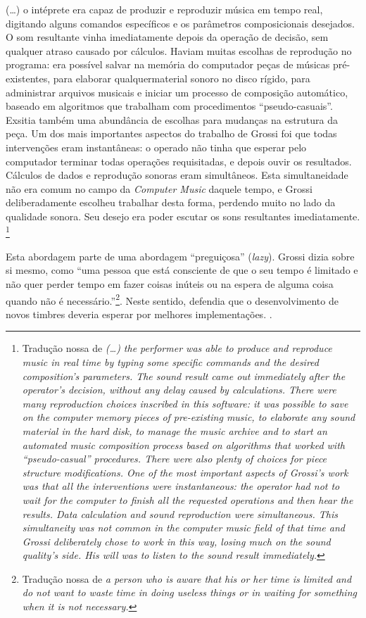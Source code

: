 \begin{citacao}
(\ldots) o intéprete era capaz de produzir e reproduzir música em tempo real, digitando alguns comandos específicos e os parâmetros composicionais desejados. O som resultante vinha imediatamente depois da operação de decisão, sem qualquer atraso causado por cálculos. Haviam muitas escolhas de reprodução no programa: era possível salvar na memória do computador peças de músicas pré-existentes, para elaborar qualquermaterial sonoro no disco rígido, para administrar arquivos musicais e iniciar um processo de composição automático, baseado em algoritmos que trabalham com procedimentos ``pseudo-casuais''. Exsitia também uma abundância de escolhas para mudanças na estrutura da peça. Um dos mais importantes aspectos do trabalho de Grossi foi que todas intervenções eram instantâneas: o operado não tinha que esperar pelo computador terminar todas operações requisitadas, e depois ouvir os resultados. Cálculos de dados e reprodução sonoras eram simultâneos. Esta simultaneidade não era comum no campo da \emph{Computer Music} daquele tempo, e Grossi deliberadamente escolheu trabalhar desta forma, perdendo muito no lado da qualidade sonora. Seu desejo era poder escutar os sons resultantes imediatamente. \cite[p.~126]{mori_pietro_2015} \footnote{Tradução nossa de \emph{(\ldots) the performer was able to produce and reproduce music in real time by typing some specific commands and the desired composition's parameters. The sound result came out immediately after the operator's decision, without any delay caused by calculations. There were many reproduction choices inscribed in this software: it was possible to save on the computer memory pieces of pre-existing music, to elaborate any sound material in the hard disk, to manage the music archive and to start an automated music composition process based on algorithms that worked with “pseudo-casual” procedures. There were also plenty of choices for piece structure modifications. One of the most important aspects of Grossi’s work was that all the interventions were instantaneous: the operator had not to wait for the computer to finish all the requested operations and then hear the results. Data calculation and sound reproduction were simultaneous. This simultaneity was not common in the computer music field of that time and Grossi deliberately chose to work in this way, losing much on the sound quality’s side. His will was to listen to the sound result immediately.}}
\end{citacao}

Esta abordagem parte de uma abordagem ``preguiçosa'' (\emph{lazy}). Grossi dizia sobre si mesmo, como ``uma pessoa que está consciente de que o seu tempo é limitado e não quer perder tempo em fazer coisas inúteis ou na espera de alguma coisa quando não é necessário.''\footnote{Tradução nossa de \emph{a person who is aware that his or her time is limited and do not want to waste time in doing useless things or in waiting for something when it is not necessary.}}. Neste sentido, defendia que o desenvolvimento de novos timbres deveria esperar por melhores implementações. .

